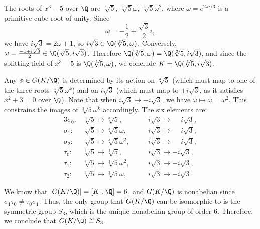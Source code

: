 \begin{solution}[(i)]
  The roots of $x^3 - 5$ over $\Q$ are $\sqrt[3]{5},\, \sqrt[3]{5}\omega,\, \sqrt[3]{5}\omega^2$, where $\omega = e^{2\pi i/3}$ is a primitive cube root of unity. Since
  \[%
    \omega = -\frac{1}{2} + \frac{\sqrt{3}}{2}i
  ,\]%
  we have $i\sqrt{3} = 2\omega + 1$, so $i\sqrt{3} \in \Q(\sqrt[3]{5}, \omega)$. Conversely, $\omega = \frac{-1 + i\sqrt{3}}{2} \in \Q(\sqrt[3]{5}, i\sqrt{3})$. Therefore $\Q(\sqrt[3]{5}, \omega) = \Q(\sqrt[3]{5}, i\sqrt{3})$, and since the splitting field of $x^3 - 5$ is $\Q(\sqrt[3]{5}, \omega)$, we conclude $K = \Q(\sqrt[3]{5}, i\sqrt{3})$.
\end{solution}

\begin{solution}[(ii)]
  Any $\phi \in G(K/\Q)$ is determined by its action on $\sqrt[3]{5}$ (which must map to one of the three roots $\sqrt[3]{5}\omega^k$) and on $i\sqrt{3}$ (which must map to $\pm i\sqrt{3}$, as it satisfies $x^2 + 3 = 0$ over $\Q$). Note that when $i\sqrt{3} \mapsto -i\sqrt{3}$, we have $\omega \mapsto \bar{\omega} = \omega^2$. This constrains the images of $\sqrt[3]{5}\omega^k$ accordingly. The six elements are:
  \begin{alignat*}{3}
    \sigma_0:& \sqrt[3]{5} \mapsto \sqrt[3]{5},\quad&& i\sqrt{3} \mapsto \phantom{-}i\sqrt{3}, \\
    \sigma_1:& \sqrt[3]{5} \mapsto \sqrt[3]{5}\omega,\quad&& i\sqrt{3} \mapsto \phantom{-}i\sqrt{3}, \\
    \sigma_2:& \sqrt[3]{5} \mapsto \sqrt[3]{5}\omega^2,\quad&& i\sqrt{3} \mapsto \phantom{-}i\sqrt{3}, \\
    \tau_0:& \sqrt[3]{5} \mapsto \sqrt[3]{5},\quad&& i\sqrt{3} \mapsto -i\sqrt{3}, \\
    \tau_1:& \sqrt[3]{5} \mapsto \sqrt[3]{5}\omega^2,\quad&& i\sqrt{3} \mapsto -i\sqrt{3}, \\
    \tau_2:& \sqrt[3]{5} \mapsto \sqrt[3]{5}\omega,\quad&& i\sqrt{3} \mapsto -i\sqrt{3}
  .\tag*{\qedhere}\end{alignat*}
\end{solution}

\begin{solution}[(iii)]
  We know that $|G(K/\Q)| = [K : \Q] = 6$, and $G(K/\Q)$ is nonabelian since $\sigma_1\tau_0 \ne \tau_0\sigma_1$. Thus, the only group that $G(K/\Q)$ can be isomorphic to is the symmetric group $S_3$, which is the unique nonabelian group of order $6$. Therefore, we conclude that $G(K/\Q) \cong S_3$.
\end{solution}

